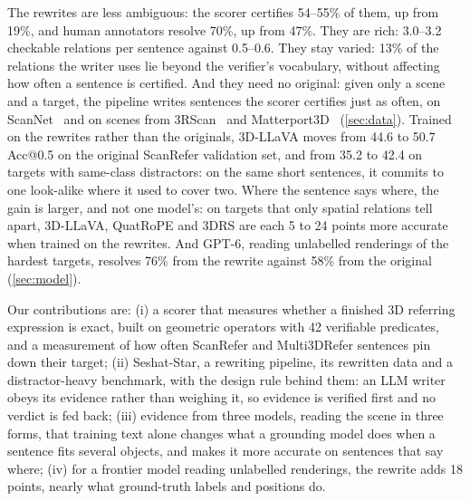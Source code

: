 The rewrites are less ambiguous: the scorer certifies 54--55\% of them, up from 19\%, and human annotators resolve 70\%, up from 47\%. They are rich: 3.0--3.2 checkable relations per sentence against 0.5--0.6. They stay varied: 13\% of the relations the writer uses lie beyond the verifier's vocabulary, without affecting how often a sentence is certified. And they need no original: given only a scene and a target, the pipeline writes sentences the scorer certifies just as often, on ScanNet~\cite{scannet} and on scenes from 3RScan~\cite{3rscan} and Matterport3D~\cite{matterport3d} (\cref{sec:data}). Trained on the rewrites rather than the originals, 3D-LLaVA moves from 44.6 to 50.7 Acc@0.5 on the original ScanRefer validation set, and from 35.2 to 42.4 on targets with same-class distractors: on the same short sentences, it commits to one look-alike where it used to cover two. Where the sentence says where, the gain is larger, and not one model's: on targets that only spatial relations tell apart, 3D-LLaVA, QuatRoPE and 3DRS are each 5 to 24 points more accurate when trained on the rewrites. And GPT-6, reading unlabelled renderings of the hardest targets, resolves 76\% from the rewrite against 58\% from the original (\cref{sec:model}).

Our contributions are: (i) a scorer that measures whether a finished 3D referring expression is exact, built on geometric operators with 42 verifiable predicates, and a measurement of how often ScanRefer and Multi3DRefer sentences pin down their target; (ii) Seshat-Star, a rewriting pipeline, its rewritten data and a distractor-heavy benchmark, with the design rule behind them: an LLM writer obeys its evidence rather than weighing it, so evidence is verified first and no verdict is fed back; (iii) evidence from three models, reading the scene in three forms, that training text alone changes what a grounding model does when a sentence fits several objects, and makes it more accurate on sentences that say where; (iv) for a frontier model reading unlabelled renderings, the rewrite adds 18 points, nearly what ground-truth labels and positions do. 
